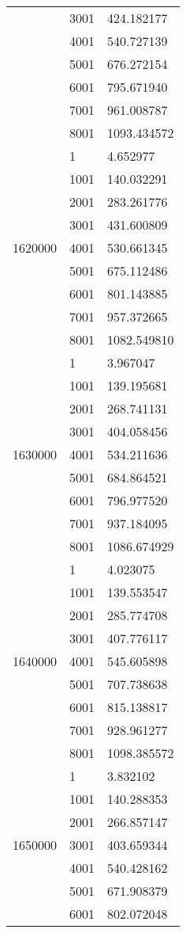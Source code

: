 \begin{table}[htb!]
\begin{tabular}{lll}
 & 3001 & 424.182177 \\
 & 4001 & 540.727139 \\
 & 5001 & 676.272154 \\
 & 6001 & 795.671940 \\
 & 7001 & 961.008787 \\
 & 8001 & 1093.434572 \\
\multirow[c]{9}{*}{1620000} & 1 & 4.652977 \\
 & 1001 & 140.032291 \\
 & 2001 & 283.261776 \\
 & 3001 & 431.600809 \\
 & 4001 & 530.661345 \\
 & 5001 & 675.112486 \\
 & 6001 & 801.143885 \\
 & 7001 & 957.372665 \\
 & 8001 & 1082.549810 \\
\multirow[c]{9}{*}{1630000} & 1 & 3.967047 \\
 & 1001 & 139.195681 \\
 & 2001 & 268.741131 \\
 & 3001 & 404.058456 \\
 & 4001 & 534.211636 \\
 & 5001 & 684.864521 \\
 & 6001 & 796.977520 \\
 & 7001 & 937.184095 \\
 & 8001 & 1086.674929 \\
\multirow[c]{9}{*}{1640000} & 1 & 4.023075 \\
 & 1001 & 139.553547 \\
 & 2001 & 285.774708 \\
 & 3001 & 407.776117 \\
 & 4001 & 545.605898 \\
 & 5001 & 707.738638 \\
 & 6001 & 815.138817 \\
 & 7001 & 928.961277 \\
 & 8001 & 1098.385572 \\
\multirow[c]{9}{*}{1650000} & 1 & 3.832102 \\
 & 1001 & 140.288353 \\
 & 2001 & 266.857147 \\
 & 3001 & 403.659344 \\
 & 4001 & 540.428162 \\
 & 5001 & 671.908379 \\
 & 6001 & 802.072048 \\

\end{tabular}
\end{table}
